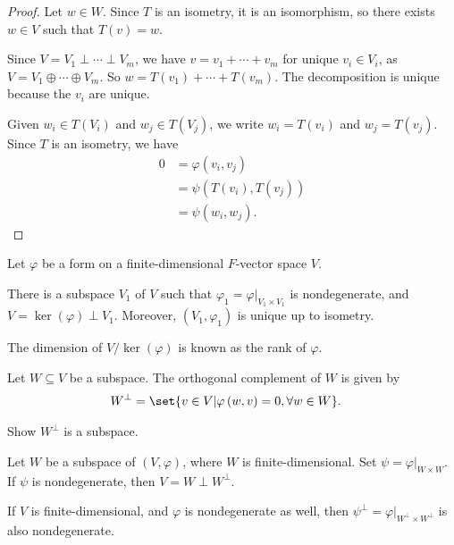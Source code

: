 \documentclass[10pt]{mypackage}
\begin{document}
  \begin{proof}
    Let $w\in W$. Since $T$ is an isometry, it is an isomorphism, so there exists $w \in V$ such that $T(v) = w$.\newline

    Since $V = V_1\perp\cdots\perp V_m$, we have $v = v_1 + \cdots + v_m$ for unique $v_i\in V_i$, as $V = V_1\oplus\cdots\oplus V_m$. So $w = T\left(v_1\right)+ \cdots + T\left(v_m\right)$. The decomposition is unique because the $v_i$ are unique.\newline

    Given $w_i\in T\left(V_i\right)$ and $w_j\in T\left(V_j\right)$, we write $w_i = T\left(v_i\right)$ and $w_j = T\left(v_j\right)$. Since $T$ is an isometry, we have
    \begin{align*}
      0 &= \varphi\left(v_i,v_j\right)\\
        &= \psi\left(T\left(v_i\right),T\left(v_j\right)\right)\\
        &= \psi\left(w_i,w_j\right).
    \end{align*}
  \end{proof}
  \begin{lemma}
    Let $\varphi$ be a form on a finite-dimensional $F$-vector space $V$.\newline

    There is a subspace $V_1$ of $V$ such that $\varphi_1 = \varphi|_{V_1\times V_1}$ is nondegenerate, and $V = \ker\left(\varphi\right) \perp V_1$. Moreover, $\left(V_1,\varphi_1\right)$ is unique up to isometry.
  \end{lemma}
  \begin{definition}
    The dimension of $V/\ker\left(\varphi\right)$ is known as the rank of $\varphi$.
  \end{definition}
  \begin{definition}
    Let $W\subseteq V$ be a subspace. The orthogonal complement of $W$ is given by
    \begin{align*}
      W^{\perp} &= \set{v\in V | \varphi\left(w,v\right) = 0,\forall w\in W}.
    \end{align*}
  \end{definition}
  \begin{exercise}
    Show $W^{\perp}$ is a subspace.
  \end{exercise}
  \begin{lemma}
    Let $W$ be a subspace of $\left(V,\varphi\right)$, where $W$ is finite-dimensional. Set $\psi = \varphi|_{W\times W}$. If $\psi$ is nondegenerate, then $V = W\perp W^{\perp}$.\newline

    If $V$ is finite-dimensional, and $\varphi$ is nondegenerate as well, then $\psi^{\perp} = \varphi|_{W^{\perp}\times W^{\perp}}$ is also nondegenerate.
  \end{lemma}
\end{document}
